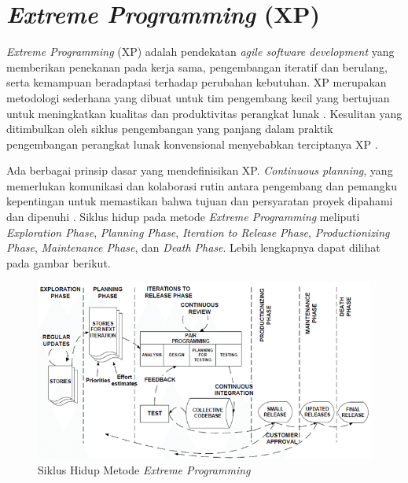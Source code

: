 \section{\textit{Extreme Programming} (XP)}

\textit{Extreme Programming} (XP) adalah pendekatan \textit{agile software development} yang memberikan penekanan pada kerja sama, pengembangan iteratif dan berulang, serta kemampuan beradaptasi terhadap perubahan kebutuhan. XP merupakan metodologi sederhana yang dibuat untuk tim pengembang kecil yang bertujuan untuk meningkatkan kualitas dan produktivitas perangkat lunak \parencite{article:matharu}. Kesulitan yang ditimbulkan oleh siklus pengembangan yang panjang dalam praktik pengembangan perangkat lunak konvensional menyebabkan terciptanya XP \parencite{article:rao}.

Ada berbagai prinsip dasar yang mendefinisikan XP. \textit{Continuous planning}, yang memerlukan komunikasi dan kolaborasi rutin antara pengembang dan pemangku kepentingan untuk memastikan bahwa tujuan dan persyaratan proyek dipahami dan dipenuhi \parencite{article:matharu}. Siklus hidup pada metode \textit{Extreme Programming} meliputi \textit{Exploration Phase}, \textit{Planning Phase}, \textit{Iteration to Release Phase}, \textit{Productionizing Phase}, \textit{Maintenance Phase}, dan \textit{Death Phase}. Lebih lengkapnya dapat dilihat pada gambar berikut.

\begin{figure}[ht]
    \includegraphics[width=1\linewidth, center]{images/tinjauan-pustaka/fig-xp-lifecycle.png}
    \caption{Siklus Hidup Metode \textit{Extreme Programming} \parencite{article:anwer}}
    \label{fig:xp-lifecycle}
\end{figure}


